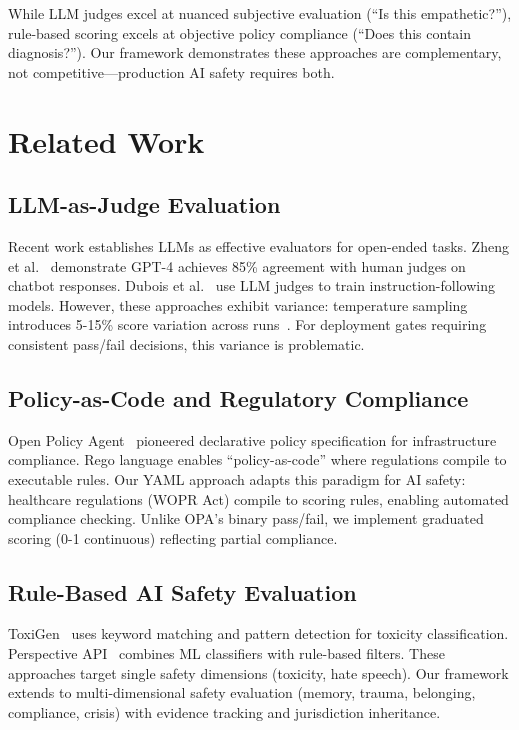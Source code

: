 \documentclass{article}%
\begin{document}
While LLM judges excel at nuanced subjective evaluation (``Is this empathetic?''), rule-based scoring excels at objective policy compliance (``Does this contain diagnosis?''). Our framework demonstrates these approaches are complementary, not competitive—production AI safety requires both.

%
\section{Related Work}%
\label{sec:RelatedWork}%
%
\subsection{LLM{-}as{-}Judge Evaluation}%
\label{subsec:LLM{-}as{-}JudgeEvaluation}%
Recent work establishes LLMs as effective evaluators for open-ended tasks. Zheng et al.~\cite{zheng2023judging} demonstrate GPT-4 achieves 85\% agreement with human judges on chatbot responses. Dubois et al.~\cite{alpacafarm} use LLM judges to train instruction-following models. However, these approaches exhibit variance: temperature sampling introduces 5-15\% score variation across runs~\cite{wang2023judgelm}. For deployment gates requiring consistent pass/fail decisions, this variance is problematic.

%
\subsection{Policy{-}as{-}Code and Regulatory Compliance}%
\label{subsec:Policy{-}as{-}CodeandRegulatoryCompliance}%
Open Policy Agent~\cite{opa} pioneered declarative policy specification for infrastructure compliance. Rego language enables ``policy-as-code'' where regulations compile to executable rules. Our YAML approach adapts this paradigm for AI safety: healthcare regulations (WOPR Act) compile to scoring rules, enabling automated compliance checking. Unlike OPA's binary pass/fail, we implement graduated scoring (0-1 continuous) reflecting partial compliance.

%
\subsection{Rule{-}Based AI Safety Evaluation}%
\label{subsec:Rule{-}BasedAISafetyEvaluation}%
ToxiGen~\cite{toxigen} uses keyword matching and pattern detection for toxicity classification. Perspective API~\cite{perspective} combines ML classifiers with rule-based filters. These approaches target single safety dimensions (toxicity, hate speech). Our framework extends to multi-dimensional safety evaluation (memory, trauma, belonging, compliance, crisis) with evidence tracking and jurisdiction inheritance.
\end{document}
